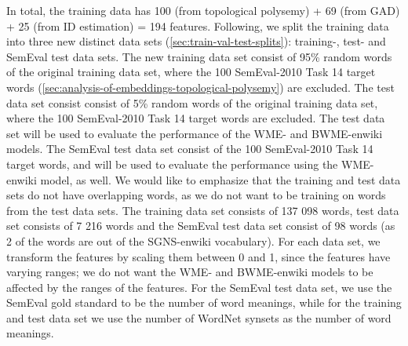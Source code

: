 In total, the training data has 100 (from topological polysemy) + 69 (from GAD) + 25 (from ID estimation) = 194 features. Following, we split the training data into three new distinct data sets (\cref{sec:train-val-test-splits}): training-, test- and SemEval test data sets. The new training data set consist of 95\% random words of the original training data set, where the 100 SemEval-2010 Task 14 target words (\cref{sec:analysis-of-embeddings-topological-polysemy}) are excluded. The test data set consist consist of 5\% random words of the original training data set, where the 100 SemEval-2010 Task 14 target words are excluded. The test data set will be used to evaluate the performance of the WME- and BWME-enwiki models. The SemEval test data set consist of the 100 SemEval-2010 Task 14 target words, and will be used to evaluate the performance using the WME-enwiki model, as well. We would like to emphasize that the training and test data sets do not have overlapping words, as we do not want to be training on words from the test data sets. The training data set consists of 137 098 words, test data set consists of 7 216 words and the SemEval test data set consist of 98 words (as 2 of the words are out of the SGNS-enwiki vocabulary). For each data set, we transform the features by scaling them between 0 and 1, since the features have varying ranges; we do not want the WME- and BWME-enwiki models to be affected by the ranges of the features. For the SemEval test data set, we use the SemEval gold standard to be the number of word meanings, while for the training and test data set we use the number of WordNet synsets as the number of word meanings.

